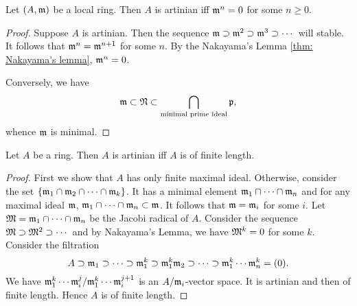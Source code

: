         \begin{proposition}\label{prop: characteristic of local artinian rings}
            Let $(A,{\mathfrak{m}})$ be a local ring.
            Then $A$ is artinian iff ${\mathfrak{m}}^n = 0$ for some $n\geq 0$.    
        \end{proposition}
        \begin{proof}
            Suppose $A$ is artinian.
            Then the sequence ${\mathfrak{m}} \supset {\mathfrak{m}}^2 \supset {\mathfrak{m}}^3 \supset \cdots$ will stable.
            It follows that ${\mathfrak{m}}^n = {\mathfrak{m}}^{n+1}$ for some $n$.
            By the Nakayama's Lemma \ref{thm: Nakayama's lemma}, ${\mathfrak{m}}^n = 0$.

            Conversely, we have 
            \[ {\mathfrak{m}} \subset {\mathfrak{N}} \subset \bigcap_{\text{minimal prime ideal}} {\mathfrak{p}},\] 
            whence ${\mathfrak{m}}$ is minimal.
        \end{proof}

        \begin{proposition}\label{prop: artinian ring is of finite length}
            Let $A$ be a ring. 
            Then $A$ is artinian iff $A$ is of finite length.
        \end{proposition}
        \begin{proof}
            First we show that $A$ has only finite maximal ideal.
            Otherwise, consider the set $\{{\mathfrak{m}}_1 \cap {\mathfrak{m}}_2 \cap \cdots \cap {\mathfrak{m}}_k\}$.
            It has a minimal element ${\mathfrak{m}}_1 \cap \cdots \cap {\mathfrak{m}}_n$ and for any maximal ideal ${\mathfrak{m}}$, ${\mathfrak{m}}_1 \cap \cdots \cap {\mathfrak{m}}_n \subset {\mathfrak{m}}$.
            It follows that ${\mathfrak{m}} = {\mathfrak{m}}_i$ for some $i$.
            Let ${\mathfrak{M}} = {\mathfrak{m}}_1 \cap \cdots \cap {\mathfrak{m}}_n$ be the Jacobi radical of $A$.
            Consider the sequence ${\mathfrak{M}} \supset {\mathfrak{M}}^2 \supset \cdots$ and by Nakayama's Lemma, we have ${\mathfrak{M}}^k = 0$ for some $k$.
            Consider the filtration 
            \[ A \supset {\mathfrak{m}}_1 \supset \cdots \supset {\mathfrak{m}}_1^k \supset {\mathfrak{m}}_1^k{\mathfrak{m}}_2 \supset \cdots \supset {\mathfrak{m}}_1^k \cdots {\mathfrak{m}}_n^k  = (0). \] 
            We have ${\mathfrak{m}}_1^k\cdots{\mathfrak{m}}_i^j/{\mathfrak{m}}_1^k\cdots{\mathfrak{m}}_i^{j+1}$ is an $A/{\mathfrak{m}}_i$-vector space.
            It is artinian and then of finite length.
            Hence $A$ is of finite length.
        \end{proof}
        
